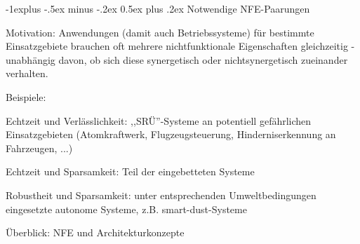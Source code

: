 \documentclass[a4paper]{article}
\makeatletter
\newcommand{\cmark}{\ding{51}}
\newcommand{\xmark}{\ding{55}}
\renewcommand{\subsection}{\@startsection{subsection}{2}{0mm}%
 {-1explus -.5ex minus -.2ex}%
 {0.5ex plus .2ex}%
 {\normalfont\normalsize\bfseries}}
\makeatother
\begin{document}
\begin{multicols}{3}
    \subsection{Notwendige NFE-Paarungen}

    \begin{itemize*}
        \item Motivation: Anwendungen (damit auch Betriebssysteme) für bestimmte
        Einsatzgebiete brauchen oft mehrere nichtfunktionale Eigenschaften
        gleichzeitig - unabhängig davon, ob sich diese synergetisch oder
        nichtsynergetisch zueinander verhalten.
        \item Beispiele:
        \begin{itemize*}
            \item Echtzeit und Verlässlichkeit: ,,SRÜ''-Systeme an potentiell gefährlichen Einsatzgebieten (Atomkraftwerk, Flugzeugsteuerung, Hinderniserkennung an Fahrzeugen, ...)
            \item Echtzeit und Sparsamkeit: Teil der eingebetteten Systeme
            \item Robustheit und Sparsamkeit: unter entsprechenden Umweltbedingungen eingesetzte autonome Systeme, z.B. smart-dust-Systeme
        \end{itemize*}
    \end{itemize*}

    Überblick: NFE und Architekturkonzepte



\end{multicols}
\end{document}
